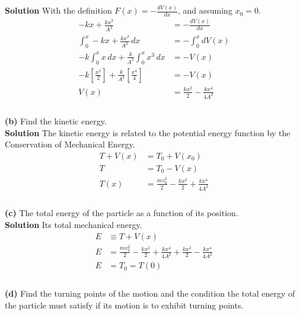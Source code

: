 \documentclass[]{article}
\newcommand{\bd}{\textbf}
\begin{document}
\bd{Solution} With the definition $ F(x) = -\frac{dV(x)}{dx} $, and assuming $ x_0 = 0 $.
\begin{equation}
	\begin{split}
		-kx + \frac{kx^3}{A^2} &= -\frac{dV(x)}{dx} \\
		\int_{0}^{x} -kx + \frac{kx^3}{A^2} \, dx &= -\int_{0}^{x} dV(x) \\
		-k\int_{0}^{x} x \, dx + \frac{k}{A^2}\int_{0}^{x} x^3 \, dx &= -V(x) \\
		-k\left[\frac{x^2}{2}\right] + \frac{k}{A^2}\left[\frac{x^4}{4}\right] &= -V(x) \\
		V(x) &= \frac{kx^2}{2} - \frac{kx^4}{4A^2} \\
	\end{split}
\end{equation}
\\
\bd{(b)} Find the kinetic energy. \\

\bd{Solution} The kinetic energy is related to the potential energy function by the Conservation of Mechanical Energy.
\begin{equation}
	\begin{split}
		T + V(x) &= T_0 + V(x_0) \\
		T &= T_0 - V(x) \\
		T(x) &= \frac{mv_0^2}{2} - \frac{kx^2}{2} + \frac{kx^4}{4A^2} \\
	\end{split}
\end{equation}
\\
\bd{(c)} The total energy of the particle as a function of its position. \\

\bd{Solution} Its total mechanical energy.
\begin{equation}
	\begin{split}
		E &\equiv T + V(x) \\
		E &= \frac{mv_0^2}{2} - \frac{kx^2}{2} + \frac{kx^4}{4A^2} + \frac{kx^2}{2} - \frac{kx^4}{4A^2} \\
		E &= T_0 = T(0) \\ 
	\end{split}
\end{equation}
\\
\bd{(d)} Find the turning points of the motion and the condition the total energy of the particle must satisfy if its motion is to exhibit turning points. \\
\end{document}
